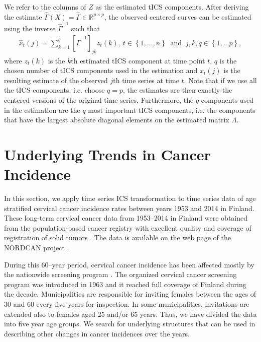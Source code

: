 \documentclass{llncs}
\begin{document}
We refer to the columns of $Z$ as the estimated tICS components. After deriving the estimate $\hat{\Gamma}\left(X\right) = \hat{\Gamma}\in \mathbb{R}^{p\times p}$,  the observed centered curves can be  estimated using the inverse $\hat{\Gamma}^{-1}$ such that
\begin{align}
\label{estimation}
\hat{x}_t\left(j\right)= \sum_{k=1}^q  \left[\hat{\Gamma}^{-1}\right]_{jk} z_t\left(k\right) , \ t\in \left\{1,\ldots, n\right\}  \ \text{ and  } \ j,k,q \in \left\{1,\ldots p\right\},
\end{align}
where $z_t\left(k\right)$ is the $k$th estimated tICS component at time point $t$, $q$ is the chosen number of tICS components used in the estimation and $\hat{x}_t\left(j\right)$ is the resulting estimate of the observed $j$th time series at  time $t$.  Note that if we use all the tICS components, i.e. choose $q=p$, the estimates are then exactly the centered versions of the original time series. Furthermore, the $q$ components used in the estimation are the $q$ most important tICS components, i.e. the components that have the   largest absolute  diagonal elements on the estimated  matrix $\Lambda$. 


\section{Underlying Trends in Cancer Incidence}\label{data}
In this section, we apply time series ICS transformation to time series data of age stratified cervical cancer incidence rates between years 1953 and 2014 in Finland.
These long-term cervical cancer data from 1953--2014 in Finland were obtained from the population-based cancer registry with excellent quality and coverage of registration of solid tumors \cite{leinonen2016,teppo1994}. The data is available on  the web page of the NORDCAN project \cite{engholm2010}.

During this 60--year period, cervical cancer incidence has been affected mostly by the nationwide screening program \cite{hakama1975}. The organized cervical cancer screening program was introduced in 1963 and it reached full coverage of Finland during the decade. Municipalities are responsible for inviting females between the ages of 30 and 60 every five years for inspection. In some municipalities, invitations are extended also to females aged 25 and/or 65 years. Thus, we have divided the data into five year age groups.  We  search for underlying structures that can be used in describing other changes in cancer incidences over the years. 
 
\end{document}
